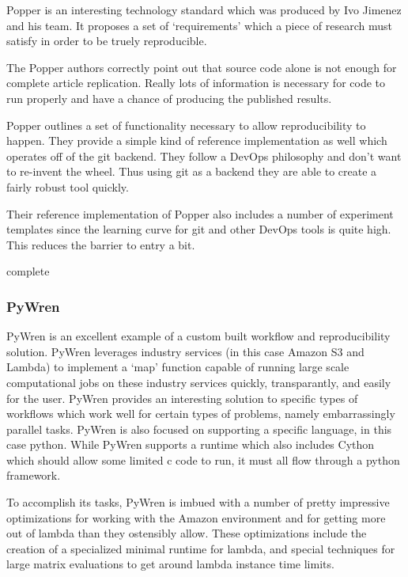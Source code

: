 \documentclass[american]{article}
\newcommand{\complete}{
	\gls{complete}
}
\begin{document}
Popper \cite{popper} is an interesting technology standard which was produced by Ivo Jimenez and his team. It proposes a set of `requirements' which a piece of research must satisfy in order to be truely reproducible.

The Popper authors correctly point out that source code alone is not enough for complete article replication. Really lots of information is necessary for code to run properly and have a chance of producing the published results.

Popper outlines a set of functionality necessary to allow reproducibility to happen. They provide a simple kind of reference implementation as well which operates off of the git backend. They follow a DevOps philosophy and don't want to re-invent the wheel. Thus using git as a backend they are able to create a fairly robust tool quickly.

Their reference implementation of Popper also includes a number of experiment templates since the learning curve for git and other DevOps tools is quite high. This reduces the barrier to entry a bit.

\complete

\subsubsection{PyWren} \label{sec:software-managers-pywren}

PyWren is an excellent example of a custom built workflow and reproducibility solution. PyWren leverages industry services (in this case Amazon S3 and Lambda) to implement a `map' function capable of running large scale computational jobs on these industry services quickly, transparantly, and easily for the user. PyWren provides an interesting solution to specific types of workflows which work well for certain types of problems, namely embarrassingly parallel tasks. PyWren is also focused on supporting a specific language, in this case python. While PyWren supports a runtime which also includes Cython which should allow some limited c code to run, it must all flow through a python framework.

To accomplish its tasks, PyWren is imbued with a number of pretty impressive optimizations for working with the Amazon environment and for getting more out of lambda than they ostensibly allow. These optimizations include the creation of a specialized minimal runtime for lambda, and special techniques for large matrix evaluations to get around lambda instance time limits.
\end{document}
